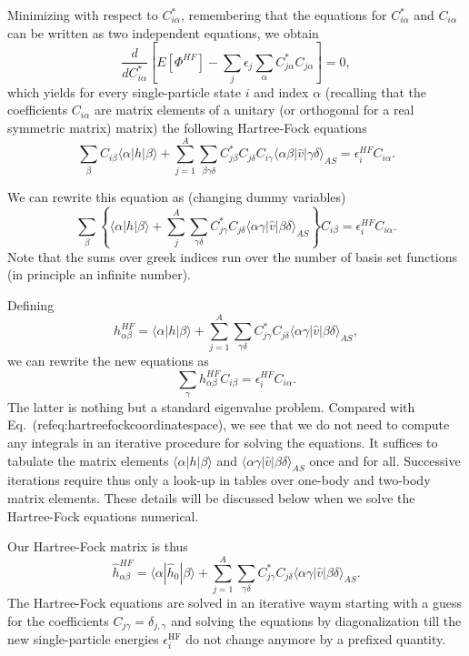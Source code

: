 Minimizing with respect to $C^*_{i\alpha}$, remembering that the
equations for $C^*_{i\alpha}$ and $C_{i\alpha}$ can be written as two
independent equations, we obtain
\[
\frac{d}{dC^*_{i\alpha}}\left[  E[\Phi^{HF}] - \sum_{j}\epsilon_j\sum_{\alpha} C^*_{j\alpha}C_{j\alpha}\right]=0,
\]
which yields for every single-particle state $i$ and index $\alpha$
(recalling that the coefficients $C_{i\alpha}$ are matrix elements of
a unitary (or orthogonal for a real symmetric matrix) matrix) the
following Hartree-Fock equations
\[
\sum_{\beta} C_{i\beta}\langle \alpha | h | \beta \rangle+
\sum_{j=1}^A\sum_{\beta\gamma\delta} C^*_{j\beta}C_{j\delta}C_{i\gamma}\langle \alpha\beta|\hat{v}|\gamma\delta\rangle_{AS}=\epsilon_i^{HF}C_{i\alpha}.
\]


We can rewrite this equation as (changing dummy variables)
\[
\sum_{\beta} \left\{\langle \alpha | h | \beta \rangle+
\sum_{j}^A\sum_{\gamma\delta} C^*_{j\gamma}C_{j\delta}\langle \alpha\gamma|\hat{v}|\beta\delta\rangle_{AS}\right\}C_{i\beta}=\epsilon_i^{HF}C_{i\alpha}.
\]
Note that the sums over greek indices run over the number of basis set
functions (in principle an infinite number).





Defining 
\[
h_{\alpha\beta}^{HF}=\langle \alpha | h | \beta \rangle+
\sum_{j=1}^A\sum_{\gamma\delta} C^*_{j\gamma}C_{j\delta}\langle \alpha\gamma|\hat{v}|\beta\delta\rangle_{AS},
\]
we can rewrite the new equations as 
\begin{equation}
\sum_{\gamma}h_{\alpha\beta}^{HF}C_{i\beta}=\epsilon_i^{HF}C_{i\alpha}. \label{eq:newhf}
\end{equation}
The latter is nothing but a standard eigenvalue problem. Compared with
Eq.~(ref{eq:hartreefockcoordinatespace}), we see that we do not need
to compute any integrals in an iterative procedure for solving the
equations.  It suffices to tabulate the matrix elements
$\langle \alpha | h | \beta \rangle$ and
$\langle \alpha\gamma|\hat{v}|\beta\delta\rangle_{AS}$ once and for
all. Successive iterations require thus only a look-up in tables over
one-body and two-body matrix elements. These details will be discussed
below when we solve the Hartree-Fock equations numerical.


Our Hartree-Fock matrix is thus
\[
\hat{h}_{\alpha\beta}^{HF}=\langle \alpha | \hat{h}_0 | \beta \rangle+
\sum_{j=1}^A\sum_{\gamma\delta} C^*_{j\gamma}C_{j\delta}\langle \alpha\gamma|\hat{v}|\beta\delta\rangle_{AS}.
\]
The Hartree-Fock equations are solved in an iterative waym starting
with a guess for the coefficients $C_{j\gamma}=\delta_{j,\gamma}$ and
solving the equations by diagonalization till the new single-particle
energies $\epsilon_i^{\mathrm{HF}}$ do not change anymore by a
prefixed quantity.




